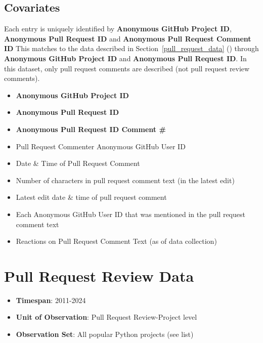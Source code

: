 \documentclass[12pt,notitlepage]{article}
\begin{document}
\subsection*{Covariates}
Each entry is uniquely identified by \textbf{Anonymous GitHub Project ID}, \textbf{Anonymous Pull Request ID} and \textbf{Anonymous Pull Request Comment ID} 
This matches to the data described in Section~\ref{pull_request_data} () through \textbf{Anonymous GitHub Project ID} and  \textbf{Anonymous Pull Request ID}. In this dataset, only pull request comments are described (not pull request review comments). 
\begin{itemize}
    \item \textbf{Anonymous GitHub Project ID}
    \item \textbf{Anonymous Pull Request ID}
    \item \textbf{Anonymous Pull Request ID Comment \# }
    \item Pull Request Commenter Anonymous GitHub User ID
    \item Date \& Time of Pull Request Comment
    \item Number of characters in pull request comment text (in the latest edit)
    \item Latest edit date \& time of pull request comment
    \item Each Anonymous GitHub User ID that was mentioned in the pull request comment text
    \item Reactions on Pull Request Comment Text (as of data collection)
\end{itemize}

\section*{Pull Request Review Data}
\begin{itemize}
    \item \textbf{Timespan}: 2011-2024
    \item \textbf{Unit of Observation}: Pull Request Review-Project level
    \item \textbf{Observation Set}: All popular Python projects (see list)
\end{itemize}
\end{document}
